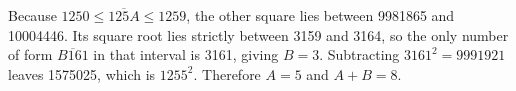 Because $ 1250\le\overline{125A}\le1259 $, the other square lies between 9981865 and 10004446. Its square root lies strictly between 3159 and 3164, so the only number of form $\overline{B161}$ in that interval is 3161, giving $ B=3 $. Subtracting $ 3161^2=9991921 $ leaves 1575025, which is $ 1255^2 $. Therefore $ A=5 $ and $\boxed{A+B=8}$.
